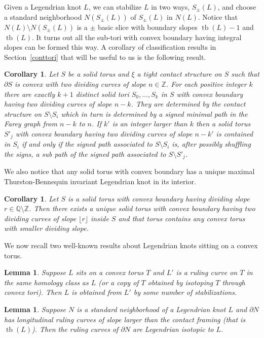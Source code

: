 \documentclass[11pt]{amsart}
\theoremstyle{plain}
\newtheorem{corollary}[theorem]{Corollary}
\newtheorem{lemma}[theorem]{Lemma}
\theoremstyle{definition}
\theoremstyle{remark}
\numberwithin{theorem}{section}
\newcommand{\Z}{\mathbb{Z}}           %
\DeclareMathOperator\tb{tb}                   %
\begin{document}
Given a Legendrian knot $L$, we can stabilize $L$ in two ways, $S_\pm(L)$, and choose a standard neighborhood $N(S_\pm(L))$ of $S_\pm(L)$ in $N(L)$. Notice that $N(L)\setminus N(S_\pm(L))$ is a $\pm$ basic slice with boundary slopes $\tb(L)-1$ and $\tb(L)$. It turns out all the sub-tori with convex boundary having integral slopes can be formed this way. A corollary of classification results in Section~\ref{conttori} that will be useful to us is the following result. 
\begin{corollary}\label{subtori}
Let $S$ be a solid torus and $\xi$ a tight contact structure on $S$ such that $\partial S$ is convex with two dividing curves of slope $n\in\Z$. For each positive integer $k$ there are exactly $k+1$ distinct solid tori $S_0,\ldots, S_{k}$ in $S$ with convex boundary having two dividing curves of slope $n-k$.  They are determined by the contact structure on $S\setminus S_i$ which in turn is determined by a signed minimal path in the Farey graph from $n-k$ to $n$. If $k'$ is an integer larger than $k$ then a solid torus $S'_j$ with convex boundary having two dividing curves of slope $n-k'$ is contained in $S_i$ if and only if the signed path associated to $S\setminus S_i$ is, after possibly shuffling the signs, a sub path of the signed path associated to $S\setminus S'_j$.
\end{corollary}
We also notice that any solid torus with convex boundary has a unique maximal Thurston-Bennequin invariant Legendrian knot in its interior. 
\begin{corollary}\label{lemma:rational}
Let $S$ is a solid torus with convex boundary having dividing slope $r\in\mathbb{Q}\setminus\mathbb{Z}$. Then there exists a unique solid torus with convex boundary having two dividing curves of slope $\lfloor{r}\rfloor$ inside $S$ and that torus contains any convex torus with smaller dividing slope.
\end{corollary}

We now recall two well-known results about Legendrian knots sitting on a convex torus. 
\begin{lemma}\label{canstablize}
Suppose $L$ sits on a convex torus $T$ and $L'$ is a ruling curve on $T$ in the same homology class as $L$ (or a copy of $T$ obtained by isotoping $T$ through convex tori). Then $L$ is obtained from $L'$ by some number of stabilizations. 
\end{lemma}

\begin{lemma}\label{isruling}
Suppose $N$ is a standard neighborhood of a Legendrian knot $L$ and $\partial N$ has longitudinal ruling curves of slope larger than the contact framing (that is $\tb(L)$). Then the ruling curves of $\partial N$ are Legendrian isotopic to $L$. 
\end{lemma}
\end{document}
